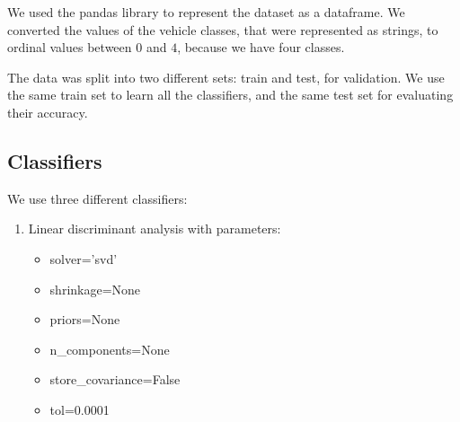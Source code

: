\documentclass{article} %
\begin{document}
  We used the pandas library to represent the dataset as a dataframe. We converted the values of the vehicle classes, that were represented as strings, to ordinal values between $0$ and $4$, because we have four classes.

  The data was split into two different sets: train and test, for validation. We use the same train set to learn all the classifiers, and the same test set for evaluating their accuracy.


\subsection{Classifiers}

 We use three different classifiers:

  \begin{enumerate}   
    \item Linear discriminant analysis with parameters:
       \begin{itemize}
           \item solver=’svd’ 
            \item shrinkage=None 
            \item priors=None 
            \item n\_components=None 
            \item store\_covariance=False 
           \item tol=0.0001
       \end{itemize}


\end{enumerate}
\end{document}
